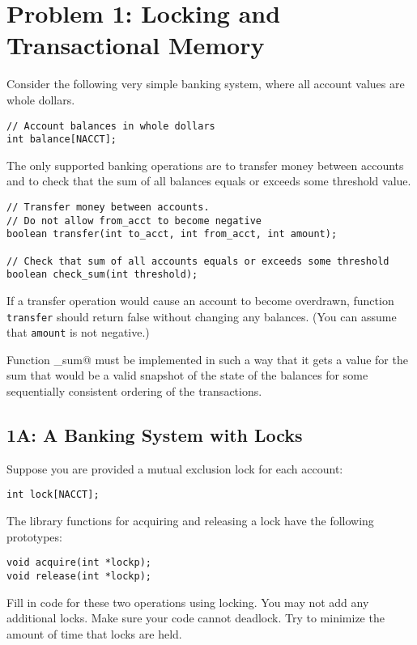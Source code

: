 \documentclass[11pt]{article}
\begin{document}
\newpage

\section*{Problem 1: Locking and Transactional Memory}


Consider the following very simple banking system, where all account values are whole dollars.
\begin{lstlisting}
// Account balances in whole dollars
int balance[NACCT];
\end{lstlisting}

The only supported banking operations are to transfer money between accounts
and to check that the sum of all balances equals or exceeds some threshold value.

\begin{lstlisting}
// Transfer money between accounts.
// Do not allow from_acct to become negative
boolean transfer(int to_acct, int from_acct, int amount);

// Check that sum of all accounts equals or exceeds some threshold
boolean check_sum(int threshold);
\end{lstlisting}

If a transfer operation would cause an account to become overdrawn,
function \texttt{transfer} should return false without changing any balances.  (You can
assume that {\tt amount} is not negative.)

Function \verb@check_sum@ must be implemented in such a way that it
gets a value for the sum that would be a valid snapshot of the
state of the balances for some sequentially consistent ordering of the
transactions.

\newpage
\subsection*{1A: A Banking System with Locks}

Suppose
you are provided a mutual exclusion lock for each account:
\begin{lstlisting}
int lock[NACCT];
\end{lstlisting}

The library functions for acquiring and releasing a lock have the following prototypes:
\begin{lstlisting}
void acquire(int *lockp);
void release(int *lockp);  
\end{lstlisting}

Fill in code for these two operations using locking.  You may not add
any additional locks.  Make sure your code cannot deadlock.  Try to
minimize the amount of time that locks are held.
\end{document}
